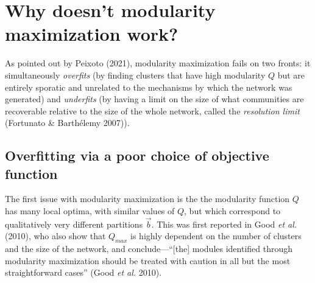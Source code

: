 \documentclass[
]{article}
\begin{document}
\hypertarget{why-doesnt-modularity-maximization-work}{%
\section{Why doesn't modularity maximization
work?}\label{why-doesnt-modularity-maximization-work}}

As pointed out by Peixoto (2021), modularity maximization fails on two
fronts: it simultaneously \emph{overfits} (by finding clusters that have
high modularity \(Q\) but are entirely sporatic and unrelated to the
mechanisms by which the network was generated) and \emph{underfits} (by
having a limit on the size of what communities are recoverable relative
to the size of the whole network, called the \emph{resolution limit}
(Fortunato \& Barthélemy 2007)).

\hypertarget{overfitting-via-a-poor-choice-of-objective-function}{%
\subsection{Overfitting via a poor choice of objective
function}\label{overfitting-via-a-poor-choice-of-objective-function}}

The first issue with modularity maximization is the the modularity
function \(Q\) has many local optima, with similar values of \(Q\), but
which correspond to qualitatively very different partitions \(\vec{b}\).
This was first reported in Good \emph{et al.} (2010), who also show that
\(Q_{max}\) is highly dependent on the number of clusters and the size
of the network, and conclude---``{[}the{]} modules identified through
modularity maximization should be treated with caution in all but the
most straightforward cases'' (Good \emph{et al.} 2010).
\end{document}
